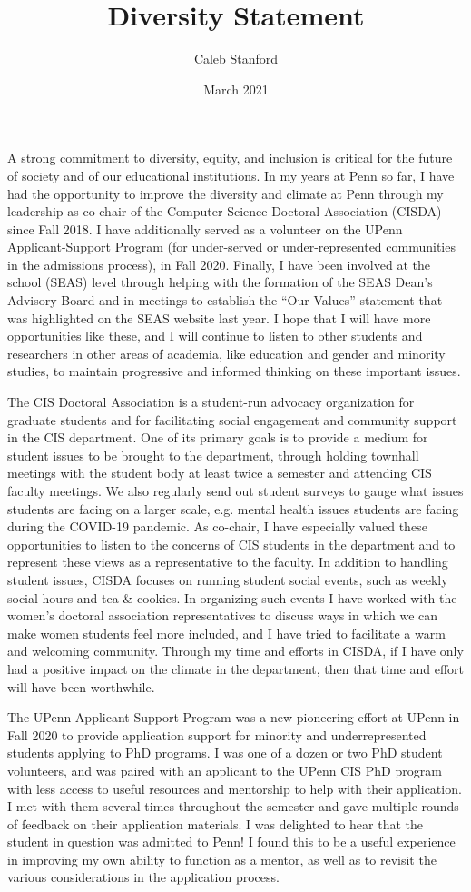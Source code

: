 \documentclass{article}
\title{Diversity Statement}
\author{Caleb Stanford}
\date{March 2021}
\begin{document}
\maketitle{}

A strong commitment to diversity, equity, and inclusion is critical for the future of society and of our educational institutions.
In my years at Penn so far, I have had the opportunity to improve the diversity and climate at Penn through my leadership as co-chair of the Computer Science Doctoral Association (CISDA) since Fall 2018.
I have additionally served as a volunteer on the UPenn Applicant-Support Program (for under-served or under-represented communities in the admissions process), in Fall 2020.
Finally, I have been involved at the school (SEAS) level
through helping with the formation of the SEAS Dean's Advisory Board
and in meetings to establish the ``Our Values'' statement that
was highlighted on the SEAS website last year.
I hope that I will have more opportunities like these, and I will continue to listen to other students and researchers in other areas of academia, like education and gender and minority studies, to maintain progressive and informed thinking on these important issues.

The CIS Doctoral Association is a student-run advocacy organization for graduate students and for facilitating social engagement and community support in the CIS department.
One of its primary goals is to
provide a medium for student issues to be brought to the department,
through holding townhall meetings with the student body at least twice a semester and attending CIS faculty meetings.
We also regularly send out student surveys to gauge what issues students are facing on a larger scale, e.g. mental health issues students are facing during the COVID-19 pandemic.
As co-chair,
I have especially valued these opportunities to listen to the concerns of CIS students in the department and to represent these views as a representative to the faculty.
In addition to handling student issues, CISDA focuses on running student social events, such as weekly social hours and tea \& cookies.
In organizing such events I have worked with the women's doctoral association representatives to discuss ways in which we can make women students feel more included, and I have tried to facilitate a warm and welcoming community.
Through my time and efforts in CISDA, if I have only had a positive impact on the climate in the department, then that time and effort will have been worthwhile.

The UPenn Applicant Support Program was a new pioneering effort at UPenn in Fall 2020 to provide application support for minority and underrepresented students applying to PhD programs.
I was one of a dozen or two PhD student volunteers, and was paired with an applicant to the UPenn CIS PhD program with less access to useful resources and mentorship to help with their application.
I met with them several times throughout the semester and gave multiple rounds of feedback on their application materials.
I was delighted to hear that the student in question was admitted to Penn!
I found this to be a useful experience in improving my own ability
to function as a mentor, as well as to
revisit the various considerations in the application process.
\end{document}
